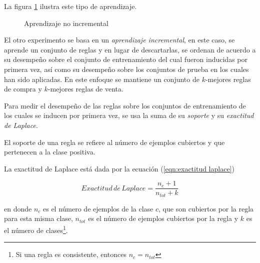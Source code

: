\documentclass[12pt]{report}
\theoremstyle{break}
\theoremstyle{break}
\begin{document}
La figura \ref{imagen:aprendizaje no incremental} ilustra este tipo de aprendizaje.
\begin{figure}[ht]
\centering
{}
\caption{\label{imagen:aprendizaje no incremental} Aprendizaje no incremental}
\end{figure}

El otro experimento se basa en un \textit{aprendizaje incremental}, en este caso, se aprende un conjunto de reglas y en lugar de descartarlas, se ordenan de acuerdo a su desempeño sobre el conjunto de entrenamiento del cual fueron inducidas por primera vez, así como su desempeño sobre los conjuntos de prueba en los cuales han sido aplicadas. En este enfoque se mantiene un conjunto de $k$-mejores reglas de compra y $k$-mejores reglas de venta.

Para medir el desempeño de las reglas sobre los conjuntos de entrenamiento de los cuales se inducen por primera vez, se usa la suma de su \textit{soporte} y su \textit{exactitud de Laplace}.

El soporte de una regla se refiere al número de ejemplos cubiertos y que pertenecen a la clase positiva.

La exactitud de Laplace está dada por la ecuación (\ref{eqn:exactitud laplace})

\begin{equation}\label{eqn:exactitud laplace}
Exactitud\,de\,Laplace = \dfrac{ n_{c} + 1 }{ n_{tot} + k }
\end{equation}

en donde $n_c$ es el número de ejemplos de la clase $c$, que son cubiertos por la regla para esta misma clase, $n_{tot}$ es el número de ejemplos cubiertos por la regla y $k$ es el número de clases\footnote{Si una regla es consistente, entonces $n_c = n_{tot}$}.
\end{document}
